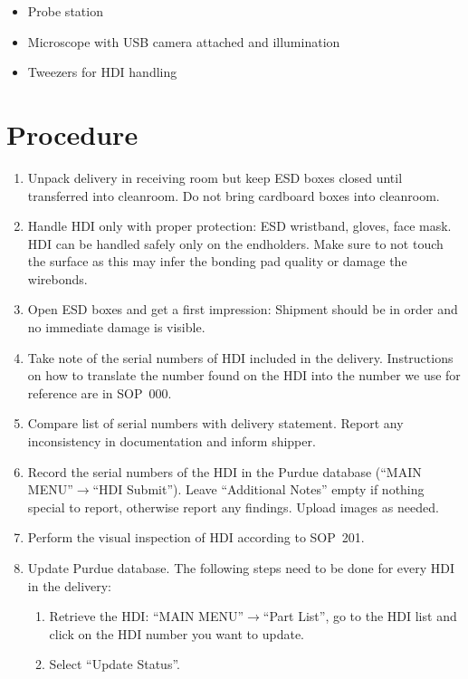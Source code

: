 \documentclass[12pt]{unlsilabsop}
\begin{document}
\begin{itemize}
    \item Probe station
    \item Microscope with USB camera attached and illumination
    \item Tweezers for HDI handling
\end{itemize}

\section{Procedure}

\begin{enumerate}
    \item Unpack delivery in receiving room but keep ESD boxes closed until transferred into cleanroom. Do not bring cardboard boxes into cleanroom.
    \item Handle HDI only with proper protection: ESD wristband, gloves, face mask. HDI can be handled safely only on the endholders. Make sure to not touch the surface as this may infer the bonding pad quality or damage the wirebonds.
    \item Open ESD boxes and get a first impression: Shipment should be in order and no immediate damage is visible.
    \item Take note of the serial numbers of HDI included in the delivery. Instructions on how to translate the number found on the HDI into the number we use for reference are in SOP~000.
    \item Compare list of serial numbers with delivery statement. Report any inconsistency in documentation and inform shipper.
    \item Record the serial numbers of the HDI in the Purdue database (``MAIN MENU''$\rightarrow$``HDI Submit''). Leave ``Additional Notes'' empty if nothing special to report, otherwise report any findings. Upload images as needed.
    \item Perform the visual inspection of HDI according to SOP~201.
    \item Update Purdue database. The following steps need to be done for every HDI in the delivery:
    \begin{enumerate}
        \item Retrieve the HDI: ``MAIN MENU''$\rightarrow$``Part List'', go to the HDI list and click on the HDI number you want to update.
        \item Select ``Update Status''.

\end{enumerate}
\end{enumerate}
\end{document}

